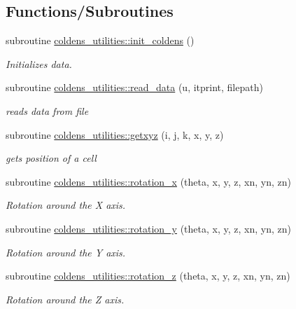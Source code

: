 \subsection*{Functions/\+Subroutines}
\begin{DoxyCompactItemize}
\item 
subroutine \hyperlink{namespacecoldens__utilities_a9fa20a511c2b17a33fdb8fc1b3bf55a2}{coldens\+\_\+utilities\+::init\+\_\+coldens} ()
\begin{DoxyCompactList}\small\item\em Initializes data. \end{DoxyCompactList}\item 
subroutine \hyperlink{namespacecoldens__utilities_a2dafe54f1edb888f313949f4f801e2d6}{coldens\+\_\+utilities\+::read\+\_\+data} (u, itprint, filepath)
\begin{DoxyCompactList}\small\item\em reads data from file \end{DoxyCompactList}\item 
subroutine \hyperlink{namespacecoldens__utilities_a7df7ce1cf8187ca5393dc35effa22020}{coldens\+\_\+utilities\+::getxyz} (i, j, k, x, y, z)
\begin{DoxyCompactList}\small\item\em gets position of a cell \end{DoxyCompactList}\item 
subroutine \hyperlink{namespacecoldens__utilities_af7f94bfb5ffee491708d3f221915abcf}{coldens\+\_\+utilities\+::rotation\+\_\+x} (theta, x, y, z, xn, yn, zn)
\begin{DoxyCompactList}\small\item\em Rotation around the X axis. \end{DoxyCompactList}\item 
subroutine \hyperlink{namespacecoldens__utilities_a989fb82adc69b6b1c00a2d2400c9854a}{coldens\+\_\+utilities\+::rotation\+\_\+y} (theta, x, y, z, xn, yn, zn)
\begin{DoxyCompactList}\small\item\em Rotation around the Y axis. \end{DoxyCompactList}\item 
subroutine \hyperlink{namespacecoldens__utilities_a062761acebb4d5a76b3706256a491687}{coldens\+\_\+utilities\+::rotation\+\_\+z} (theta, x, y, z, xn, yn, zn)
\begin{DoxyCompactList}\small\item\em Rotation around the Z axis. \end{DoxyCompactList}\item 

\end{DoxyCompactItemize}
